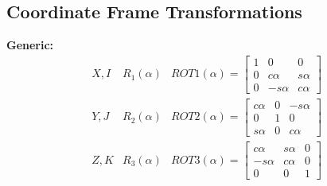 \documentclass{article}
\begin{document}
\begin{multicols*}{3}
    \subsection*{Coordinate Frame Transformations}
    \textbf{Generic:}
    \begin{equation*}
        \begin{array}{lll}
            X,I & R_1(\alpha) & ROT1(\alpha) = 
            \begin{bmatrix}
                1 & 0 & 0\\
                0 & c\alpha & s\alpha\\
                0 & -s\alpha & c\alpha
            \end{bmatrix}\\
            Y,J & R_2(\alpha) & ROT2(\alpha) = 
            \begin{bmatrix}
                c\alpha & 0 & -s\alpha\\
                0 & 1 & 0\\
                s\alpha & 0 & c\alpha
            \end{bmatrix}\\
            Z,K & R_3(\alpha) & ROT3(\alpha) = 
            \begin{bmatrix}
                c\alpha & s\alpha & 0\\
                -s\alpha & c\alpha & 0\\
                0 & 0 & 1
            \end{bmatrix}
        \end{array}
    \end{equation*}


\end{multicols*}
\end{document}
